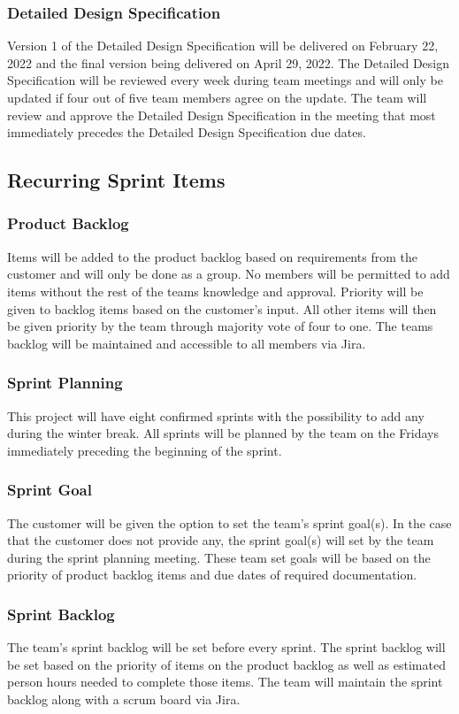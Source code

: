 \subsubsection{Detailed Design Specification}
Version 1 of the Detailed Design Specification will be delivered on February 22, 2022 and the final version being delivered on April 29, 2022. The Detailed Design Specification will be reviewed every week during team meetings and will only be updated if four out of five team members agree on the update. The team will review and approve the Detailed Design Specification in the meeting that most immediately precedes the Detailed Design Specification due dates.

\subsection{Recurring Sprint Items}
\subsubsection{Product Backlog}
Items will be added to the product backlog based on requirements from the customer and will only be done as a group. No members will be permitted to add items without the rest of the teams knowledge and approval. Priority will be given to backlog items based on the customer's input. All other items will then be given priority by the team through majority vote of four to one. The teams backlog will be maintained and accessible to all members via Jira. 

\subsubsection{Sprint Planning}
This project will have eight confirmed sprints with the possibility to add any during the winter break. All sprints will be planned by the team on the Fridays immediately preceding the beginning of the sprint. 

\subsubsection{Sprint Goal}
The customer will be given the option to set the team's sprint goal(s). In the case that the customer does not provide any, the sprint goal(s) will set by the team during the sprint planning meeting. These team set goals will be based on the priority of product backlog items and due dates of required documentation.

\subsubsection{Sprint Backlog}
The team's sprint backlog will be set before every sprint. The sprint backlog will be set based on the priority of items on the product backlog as well as estimated person hours needed to complete those items. The team will maintain the sprint backlog along with a scrum board via Jira.

